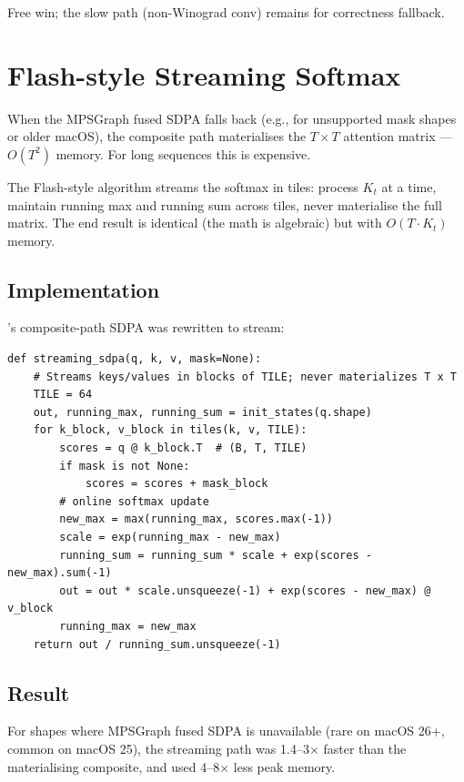 Free win; the slow path (non-Winograd conv) remains for
correctness fallback.

\section{Flash-style Streaming Softmax}
\label{sec:no_compile_sweep:flash_softmax}

When the MPSGraph fused SDPA falls back (e.g., for unsupported
mask shapes or older macOS), the composite path materialises
the $T \times T$ attention matrix --- $O(T^2)$ memory. For long
sequences this is expensive.

The Flash-style algorithm \cite{dao_flashattention_2022}
streams the softmax in tiles: process $K_t$ at a time, maintain
running max and running sum across tiles, never materialise the
full matrix. The end result is identical (the math is
algebraic) but with $O(T \cdot K_t)$ memory.

\subsection{Implementation}
\label{ssec:no_compile_sweep:flash_impl}

\Lucid's composite-path SDPA was rewritten to stream:

\begin{lstlisting}[style=lucid,language=LucidPython]
def streaming_sdpa(q, k, v, mask=None):
    # Streams keys/values in blocks of TILE; never materializes T x T
    TILE = 64
    out, running_max, running_sum = init_states(q.shape)
    for k_block, v_block in tiles(k, v, TILE):
        scores = q @ k_block.T  # (B, T, TILE)
        if mask is not None:
            scores = scores + mask_block
        # online softmax update
        new_max = max(running_max, scores.max(-1))
        scale = exp(running_max - new_max)
        running_sum = running_sum * scale + exp(scores - new_max).sum(-1)
        out = out * scale.unsqueeze(-1) + exp(scores - new_max) @ v_block
        running_max = new_max
    return out / running_sum.unsqueeze(-1)
\end{lstlisting}

\subsection{Result}
\label{ssec:no_compile_sweep:flash_result}

For shapes where MPSGraph fused SDPA is unavailable (rare on
macOS 26+, common on macOS 25), the streaming path was 1.4--3$\times$
faster than the materialising composite, and used 4--8$\times$
less peak memory.

